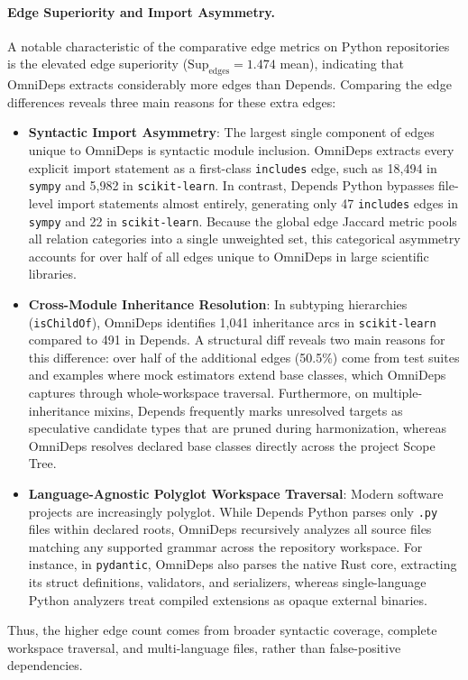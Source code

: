 \paragraph{Edge Superiority and Import Asymmetry.}
A notable characteristic of the comparative edge metrics on Python repositories
is the elevated edge superiority ($\text{Sup}_{\text{edges}} = 1.474$ mean),
indicating that OmniDeps extracts considerably more edges than Depends.
Comparing the edge differences reveals three main reasons for these extra
edges:
\begin{itemize}
  \item \textbf{Syntactic Import Asymmetry}: The largest single component of
    edges unique to OmniDeps is syntactic module inclusion. OmniDeps extracts
    every explicit import statement as a first-class \texttt{includes} edge,
    such as 18,494 in \texttt{sympy} and 5,982 in \texttt{scikit-learn}. In
    contrast, Depends Python bypasses file-level import statements almost
    entirely, generating only 47 \texttt{includes} edges in \texttt{sympy} and
    22 in \texttt{scikit-learn}. Because the global edge Jaccard metric pools
    all relation categories into a single unweighted set, this categorical
    asymmetry accounts for over half of all edges unique to OmniDeps in large
    scientific libraries.
  \item \textbf{Cross-Module Inheritance Resolution}: In subtyping hierarchies
    (\texttt{isChildOf}), OmniDeps identifies 1,041 inheritance arcs in
    \texttt{scikit-learn} compared to 491 in Depends. A structural diff reveals
    two main reasons for this difference: over half of the additional edges
    (50.5\%) come from test suites and examples where mock estimators extend
    base classes, which OmniDeps captures through whole-workspace traversal.
    Furthermore, on multiple-inheritance mixins, Depends frequently marks
    unresolved targets as speculative candidate types that are pruned during
    harmonization, whereas OmniDeps resolves declared base classes directly
    across the project Scope Tree.
  \item \textbf{Language-Agnostic Polyglot Workspace Traversal}: Modern
    software projects are increasingly polyglot. While Depends Python parses
    only \texttt{.py} files within declared roots, OmniDeps recursively
    analyzes all source files matching any supported grammar across the
    repository work\-space. For instance, in \texttt{pydantic}, OmniDeps also
    parses the native Rust core, extracting its struct definitions, validators,
    and serializers, whereas single-language Python analyzers treat compiled
    extensions as opaque external binaries.
\end{itemize}
Thus, the higher edge count comes from broader syntactic coverage, complete
workspace traversal, and multi-language files, rather than
false-positive dependencies.

